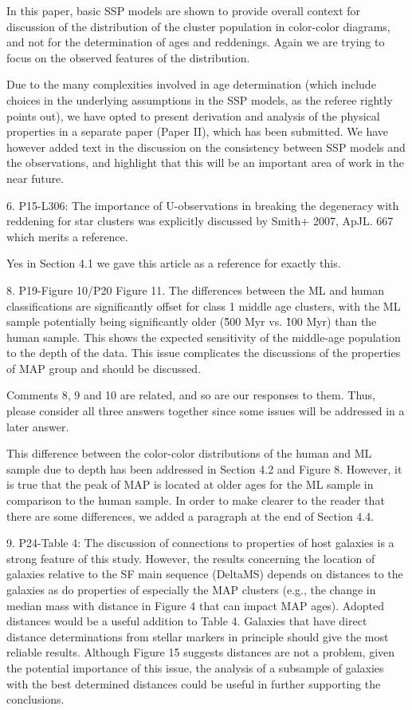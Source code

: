 In this paper, basic SSP models are shown to provide overall context for discussion of the distribution of the cluster population in color-color diagrams, and not for the determination of ages and reddenings. Again we are trying to focus on the observed features of the distribution.

Due to the many complexities involved in age determination (which include choices in the underlying assumptions in the SSP models, as the referee rightly points out), we have opted to present derivation and analysis of the physical properties in a separate paper (Paper II), which has been submitted.  We have however added text in the discussion on the consistency between SSP models and the observations, and highlight that this will be an important area of work in the near future.


6. P15-L306: The importance of U-observations in breaking the degeneracy with reddening for star clusters was explicitly discussed by Smith+ 2007, ApJL. 667 which merits a reference.

Yes in Section 4.1 we gave this article as a reference for exactly this.


8. P19-Figure 10/P20 Figure 11. The differences between the ML and human classifications are significantly offset for class 1 middle age clusters, with the ML sample potentially being significantly older (\~500 Myr vs. \~100 Myr) than the human sample. This shows the expected sensitivity of the middle-age population to the depth of the data. This issue complicates the discussions of the properties of MAP group and should be discussed.

Comments 8, 9 and 10 are related, and so are our responses to them. Thus, please consider all three answers together since some issues will be addressed in a later answer.

This difference between the color-color distributions of the human and ML sample due to depth has been addressed in Section 4.2 and Figure 8. However, it is true that the peak of MAP is located at older ages for the ML sample in comparison to the human sample. In order to make clearer to the reader that there are some differences, we added a paragraph at the end of Section 4.4. 



9. P24-Table 4: The discussion of connections to properties of host galaxies is a strong feature of this study. However, the results concerning the location of galaxies relative to the SF main sequence (DeltaMS) depends on distances to the galaxies as do properties of especially the MAP clusters (e.g., the change in median mass with distance in Figure 4 that can impact MAP ages). Adopted distances would be a useful addition to Table 4. Galaxies that have direct distance determinations from stellar markers in principle should give the most reliable results. Although Figure 15 suggests distances are not a problem, given the potential importance of this issue, the analysis of a subsample of galaxies with the best determined distances could be useful in further supporting the conclusions.

